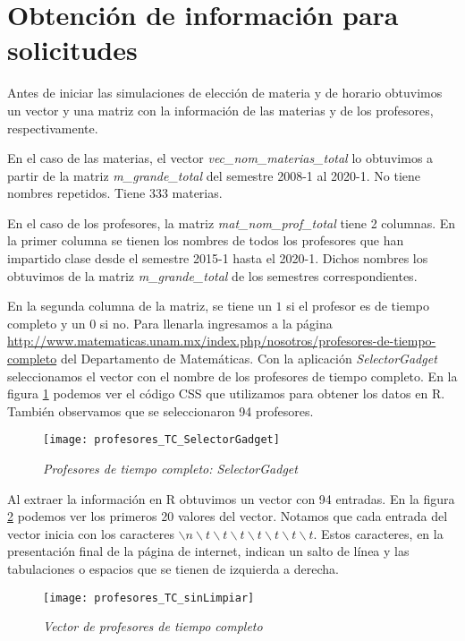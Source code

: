 \section{Obtención de información para solicitudes}

Antes de iniciar las simulaciones de elección de materia y de horario obtuvimos un vector y una matriz con la información de las materias y de los profesores, respectivamente.

En el caso de las materias, el vector \textit{vec\_nom\_materias\_total} lo obtuvimos a partir de la matriz \textit{m\_grande\_total} del semestre 2008-1 al 2020-1. No tiene nombres repetidos. Tiene 333 materias.

En el caso de los profesores, la matriz \textit{mat\_nom\_prof\_total} tiene 2 columnas. En la primer columna se tienen los nombres de todos los profesores que han impartido clase desde el semestre 2015-1 hasta el 2020-1. Dichos nombres los obtuvimos de la matriz \textit{m\_grande\_total} de los semestres correspondientes.

En la segunda columna de la matriz, se tiene un $1$ si el profesor es de tiempo completo y un $0$ si no. Para llenarla ingresamos a la página \url{http://www.matematicas.unam.mx/index.php/nosotros/profesores-de-tiempo-completo} del Departamento de Matemáticas. Con la aplicación \textit{SelectorGadget} seleccionamos el vector con el nombre de los profesores de tiempo completo. En la figura \ref{profTC_SelectorGadget} podemos ver el código CSS que utilizamos para obtener los datos en R. También observamos que se seleccionaron 94 profesores.

\begin{figure}[H]
\centering
\texttt{[image: profesores\_TC\_SelectorGadget]} %
\caption{\textit{Profesores de tiempo completo: SelectorGadget}}\label{profTC_SelectorGadget}
\end{figure}

Al extraer la información en R obtuvimos un vector con 94 entradas. En la figura \ref{profTC_sinLimpiar} podemos ver los primeros 20 valores del vector. Notamos que cada entrada del vector inicia con los caracteres $\backslash n \backslash t \backslash t \backslash t \backslash t \backslash t \backslash t \backslash t$. Estos caracteres, en la presentación final de la página de internet, indican un salto de línea y las tabulaciones o espacios que se tienen de izquierda a derecha.

\begin{figure}[H]
\centering
\texttt{[image: profesores\_TC\_sinLimpiar]} %
\caption{\textit{Vector de profesores de tiempo completo}}\label{profTC_sinLimpiar}
\end{figure}

